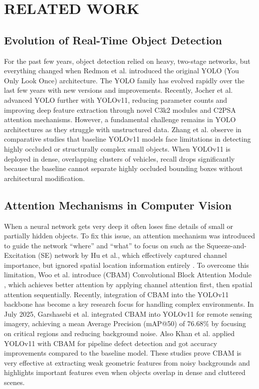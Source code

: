 \documentclass[sigconf]{acmart}
\begin{document}
\section{RELATED WORK}

\subsection{Evolution of Real-Time Object Detection}

For the past few years, object detection relied on heavy, two-stage networks, but everything changed when Redmon et al. introduced the original YOLO (You Only Look Once) architecture\cite{redmon2016you}. The YOLO family has evolved rapidly over the last few years with new versions and improvements. Recently, Jocher et al. advanced YOLO further with YOLOv11, reducing parameter counts\cite{Jocher2025YOLOv11} and improving deep feature extraction through novel C3k2 modules and C2PSA attention mechanisms\cite{9a}. However, a fundamental challenge remains in YOLO architectures as they struggle with unstructured data. Zhang et al. observe in comparative studies that baseline YOLOv11 models face limitations in detecting highly occluded or structurally complex small objects\cite{zhang2025trinext}. When YOLOv11 is deployed in dense, overlapping clusters of vehicles, recall drops significantly because the baseline cannot separate highly occluded bounding boxes without architectural modification.

\subsection{Attention Mechanisms in Computer Vision}
When a neural network gets very deep it often loses fine details of small or partially hidden objects. To fix this issue, an attention mechanism was introduced to guide the network “where” and “what” to focus on such as the Squeeze-and-Excitation (SE) network by Hu et al., which effectively captured channel importance, but ignored spatial location information entirely \cite{11a}. To overcome this limitation, Woo et al. introduce (CBAM) Convolutional Block Attention Module \cite{Woo2018CBAM}, which achieves better attention by applying channel attention first, then spatial attention sequentially. Recently, integration of CBAM into the YOLOv11 backbone has become a key research focus for handling complex environments. In July 2025, Garshasebi et al.\cite{garshasebi2025improving} integrated CBAM into YOLOv11 for remote sensing imagery, achieving a mean Average Precision (mAP@50) of 76.68\% by focusing on critical regions and reducing background noise. Also Khan et al. applied YOLOv11 with CBAM for pipeline defect detection and got accuracy improvements compared to the baseline model\cite{khan2025pipeline}. These studies prove CBAM is very effective at extracting weak geometric features from noisy backgrounds and highlights important features even when objects overlap in dense and cluttered scenes.
\end{document}
